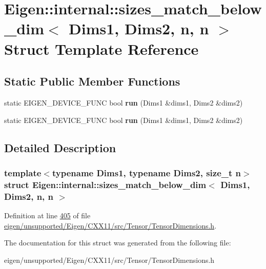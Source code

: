 \hypertarget{struct_eigen_1_1internal_1_1sizes__match__below__dim_3_01_dims1_00_01_dims2_00_01n_00_01n_01_4}{}\section{Eigen\+:\+:internal\+:\+:sizes\+\_\+match\+\_\+below\+\_\+dim$<$ Dims1, Dims2, n, n $>$ Struct Template Reference}
\label{struct_eigen_1_1internal_1_1sizes__match__below__dim_3_01_dims1_00_01_dims2_00_01n_00_01n_01_4}
\subsection*{Static Public Member Functions}
\begin{DoxyCompactItemize}
\item 
\mbox{\label{struct_eigen_1_1internal_1_1sizes__match__below__dim_3_01_dims1_00_01_dims2_00_01n_00_01n_01_4_af6b615aa41f89ab531db325bbd6dc86b}} 
static E\+I\+G\+E\+N\+\_\+\+D\+E\+V\+I\+C\+E\+\_\+\+F\+U\+NC bool {\bfseries run} (Dims1 \&dims1, Dims2 \&dims2)
\item 
\mbox{\label{struct_eigen_1_1internal_1_1sizes__match__below__dim_3_01_dims1_00_01_dims2_00_01n_00_01n_01_4_af6b615aa41f89ab531db325bbd6dc86b}} 
static E\+I\+G\+E\+N\+\_\+\+D\+E\+V\+I\+C\+E\+\_\+\+F\+U\+NC bool {\bfseries run} (Dims1 \&dims1, Dims2 \&dims2)
\end{DoxyCompactItemize}


\subsection{Detailed Description}
\subsubsection*{template$<$typename Dims1, typename Dims2, size\+\_\+t n$>$\newline
struct Eigen\+::internal\+::sizes\+\_\+match\+\_\+below\+\_\+dim$<$ Dims1, Dims2, n, n $>$}



Definition at line \hyperlink{eigen_2unsupported_2_eigen_2_c_x_x11_2src_2_tensor_2_tensor_dimensions_8h_source_l00405}{405} of file \hyperlink{eigen_2unsupported_2_eigen_2_c_x_x11_2src_2_tensor_2_tensor_dimensions_8h_source}{eigen/unsupported/\+Eigen/\+C\+X\+X11/src/\+Tensor/\+Tensor\+Dimensions.\+h}.



The documentation for this struct was generated from the following file\+:\begin{DoxyCompactItemize}
\item 
eigen/unsupported/\+Eigen/\+C\+X\+X11/src/\+Tensor/\+Tensor\+Dimensions.\+h\end{DoxyCompactItemize}
